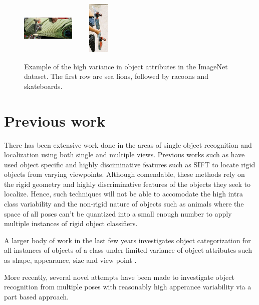 \documentclass[10pt,twocolumn,letterpaper]{article}
\begin{document}
\begin{figure}[t]
\begin{center}
   \includegraphics[width=1.0in,height=1.0in]{skate_2.jpg}
   \includegraphics[width=1.0in,height=1.0in]{skate_3.jpg}
\end{center}
   \caption{Example of the high variance in object attributes in the ImageNet dataset. The first row are
   sea lions, followed by racoons and skateboards.}
\label{fig:dataset}
\end{figure}

\section{Previous work}

There has been extensive work done in the areas of single object
recognition and localization using both single and multiple views.
Previous works such as \cite{single1,single2} have used object specific and highly
disciminative features such as SIFT \cite{feature1} to locate rigid objects
from varying viewpoints. Although comendable, these methods rely
on the rigid  geometry and highly discriminative features of the objects
they seek to localize. Hence, such techniques will not be able to accomodate the high
intra class variability and the non-rigid nature of objects such as animals where
the space of all poses can't be quantized into a small enough number to 
apply multiple instances of rigid object classifiers.

A larger body of work in the last few years investigates object categorization for all instances of 
objects of a class under limited variance of object attributes such as shape, 
appearance, size and view point \cite{view1,view2,view3}.

More recently, several novel attempts \cite{multiview1,multiview2,multiview3} have been made to investigate object recognition
from multiple poses with reasonably high apperance variability via a part based approach.
\end{document}

